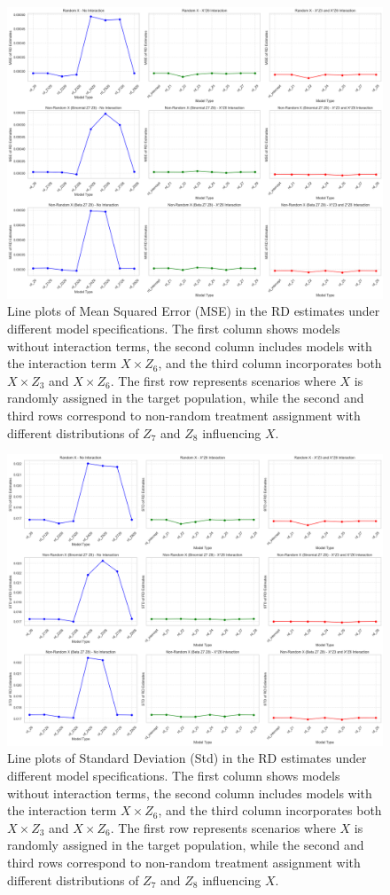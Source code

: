 \documentclass[12pt,oneside]{amsart}
\theoremstyle{definition}
\theoremstyle{remark}
\numberwithin{equation}{section}
\begin{document}
\begin{figure}[h]
    \centering
    \includegraphics[width=0.9\linewidth]{Report/Figure/line_mse.jpg}
    \caption{Line plots of Mean Squared Error (MSE) in the RD estimates under different model specifications. The first column shows models without interaction terms, the second column includes models with the interaction term $X \times Z_6$, and the third column incorporates both $X \times Z_3$ and $X \times Z_6$. The first row represents scenarios where $X$ is randomly assigned in the target population, while the second and third rows correspond to non-random treatment assignment with different distributions of $Z_7$ and $Z_8$ influencing $X$.}
    \label{fig:line_mse}
\end{figure}

\begin{figure}[h]
    \centering
    \includegraphics[width=0.9\linewidth]{Report/Figure/line_std.jpg}
    \caption{Line plots of Standard Deviation (Std) in the RD estimates under different model specifications. The first column shows models without interaction terms, the second column includes models with the interaction term $X \times Z_6$, and the third column incorporates both $X \times Z_3$ and $X \times Z_6$. The first row represents scenarios where $X$ is randomly assigned in the target population, while the second and third rows correspond to non-random treatment assignment with different distributions of $Z_7$ and $Z_8$ influencing $X$.}
    \label{fig:line_std}
\end{figure}
\end{document}
